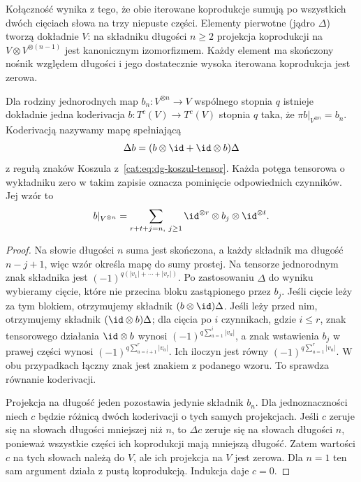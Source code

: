 Kołączność wynika z tego, że obie iterowane koprodukcje sumują po wszystkich dwóch cięciach słowa na trzy niepuste części. Elementy pierwotne (jądro $\Delta$) tworzą dokładnie $V$: na składniku długości $n\geq2$ projekcja koprodukcji na $V\otimes V^{\otimes(n-1)}$ jest kanonicznym izomorfizmem. Każdy element ma skończony nośnik względem długości i jego dostatecznie wysoka iterowana koprodukcja jest zerowa.

\begin{twierdzenie}\label{cat:thm:ainfty-coderivation}
Dla rodziny jednorodnych map $b_n:V^{\otimes n}\to V$ wspólnego stopnia $q$ istnieje dokładnie jedna koderivacja $b:T^c(V)\to T^c(V)$ stopnia $q$ taka, że $\pi b|_{V^{\otimes n}}=b_n$. Koderivacją nazywamy mapę spełniającą
\[
 \Delta b=(b\otimes\id+\id\otimes b)\Delta
\]
z regułą znaków Koszula z~\eqref{cat:eq:dg-koszul-tensor}. Każda potęga tensorowa o wykładniku zero w takim zapisie oznacza pominięcie odpowiednich czynników. Jej wzór to
\begin{equation}\label{cat:eq:ainfty-coderivation-extension}
 b|_{V^{\otimes n}}
 =\sum_{r+t+j=n,\ j\geq1}
 \id^{\otimes r}\otimes b_j\otimes\id^{\otimes t}.
\end{equation}
\end{twierdzenie}
\begin{proof}
Na słowie długości $n$ suma jest skończona, a każdy składnik ma długość $n-j+1$, więc wzór określa mapę do sumy prostej. Na tensorze jednorodnym znak składnika jest $(-1)^{q(|v_1|+\cdots+|v_r|)}$. Po zastosowaniu $\Delta$ do wyniku wybieramy cięcie, które nie przecina bloku zastąpionego przez $b_j$. Jeśli cięcie leży za tym blokiem, otrzymujemy składnik $(b\otimes\id)\Delta$. Jeśli leży przed nim, otrzymujemy składnik $(\id\otimes b)\Delta$; dla cięcia po $i$ czynnikach, gdzie $i\leq r$, znak tensorowego działania $\id\otimes b$ wynosi $(-1)^{q\sum_{a=1}^i|v_a|}$, a znak wstawienia $b_j$ w prawej części wynosi $(-1)^{q\sum_{a=i+1}^r|v_a|}$. Ich iloczyn jest równy $(-1)^{q\sum_{a=1}^r|v_a|}$. W obu przypadkach łączny znak jest znakiem z podanego wzoru. To sprawdza równanie koderivacji.

Projekcja na długość jeden pozostawia jedynie składnik $b_n$. Dla jednoznaczności niech $c$ będzie różnicą dwóch koderivacji o tych samych projekcjach. Jeśli $c$ zeruje się na słowach długości mniejszej niż $n$, to $\Delta c$ zeruje się na słowach długości $n$, ponieważ wszystkie części ich koprodukcji mają mniejszą długość. Zatem wartości $c$ na tych słowach należą do $V$, ale ich projekcja na $V$ jest zerowa. Dla $n=1$ ten sam argument działa z pustą koprodukcją. Indukcja daje $c=0$.
\end{proof}

